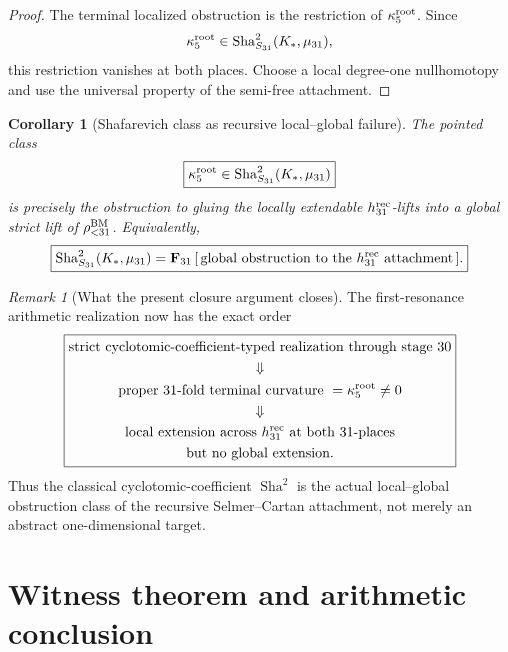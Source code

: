 \documentclass[11pt]{article}
\newtheorem{corollary}[theorem]{Corollary}
\theoremstyle{remark}
\newtheorem{remark}[theorem]{Remark}
\providecommand{\Sha}{\operatorname{Sha}}
\begin{document}
\begin{proof}
The terminal localized obstruction is the restriction of
\(\kappa_5^{\rm root}\).  Since
\[
 \kappa_5^{\rm root}
 \in
 \Sha^2_{S_{31}}(K_*,\mu_{31}),
\]
this restriction vanishes at both places.  Choose a local degree-one
nullhomotopy and use the universal property of the semi-free attachment.
\end{proof}

\begin{corollary}[Shafarevich class as recursive local--global failure]
\label{cor:v074-sha-as-cell-failure}
The pointed class
\[
 \boxed{
 \kappa_5^{\rm root}
 \in
 \Sha^2_{S_{31}}(K_*,\mu_{31})}
\]
is precisely the obstruction to gluing the locally extendable
\(h_{31}^{\rm rec}\)-lifts into a global strict lift of
\(\rho_{<31}^{\rm BM}\).  Equivalently,
\begin{equation}
 \boxed{
 \Sha^2_{S_{31}}(K_*,\mu_{31})
 =
 \mathbf F_{31}\,
 [\,\text{global obstruction to the }h_{31}^{\rm rec}\text{ attachment}\,].}
 \label{eq:v074-sha-cell-obstruction}
\end{equation}
\end{corollary}

\begin{remark}[What the present closure argument closes]
\label{rem:v074-closed}
The first-resonance arithmetic realization now has the exact order
\[
 \boxed{
 \begin{gathered}
 \text{strict cyclotomic-coefficient-typed realization through stage }30\\
 \Downarrow\\
 \text{proper \(31\)-fold terminal curvature }
 =\kappa_5^{\rm root}\ne0\\
 \Downarrow\\
 \text{local extension across }h_{31}^{\rm rec}\text{ at both }31\text{-places}\\
 \text{but no global extension.}
 \end{gathered}}
\]
Thus the classical cyclotomic-coefficient \(\Sha^2\) is the actual local--global obstruction
class of the recursive Selmer--Cartan attachment, not merely an abstract
one-dimensional target.
\end{remark}



\section{Witness theorem and arithmetic conclusion}\label{sec:export-contract}
\end{document}
